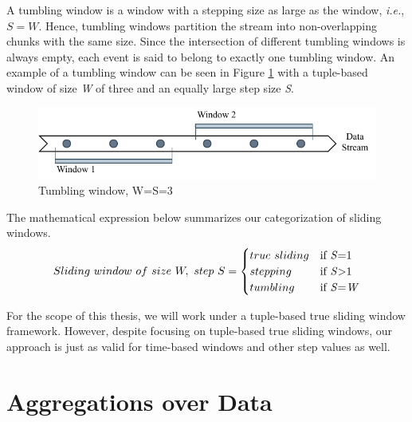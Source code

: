 A tumbling window is a window with a stepping size as large as the window, \textit{i.e.}, $S = W$. Hence, tumbling windows partition the stream into non-overlapping chunks with the same size. Since the intersection of different tumbling windows is always empty, each event is said to belong to exactly one tumbling window. An example of a tumbling window can be seen in Figure \ref{fig:tumbling-window} with a tuple-based window of size \textit{W} of three and an equally large step size \textit{S}.
\begin{figure}[!htb]
    \begin{center}
      \includegraphics[scale=1.1]{figures/tumbling.pdf}
      \caption[Tumbling window]{Tumbling window, W=S=3}
      \label{fig:tumbling-window}
    \end{center}
\end{figure}

The mathematical expression below summarizes our categorization of sliding windows.
\begin{equation} 
\label{math:windows}
  Sliding\ window \,\, of \,\, size \,\, W, \,\, step \,\, S =
    \begin{cases}
      true \,\, sliding & \text{if \textit{S}=1}\\
      stepping & \text{if \textit{S}>1}\\
      tumbling & \text{if \textit{S}=\textit{W}}
    \end{cases}
\end{equation}

For the scope of this thesis, we will work under a tuple-based true sliding window framework. However, despite focusing on tuple-based true sliding windows, our approach is just as valid for time-based windows and other step values as well.

\section{Aggregations over Data} \label{sec:aggregations}

